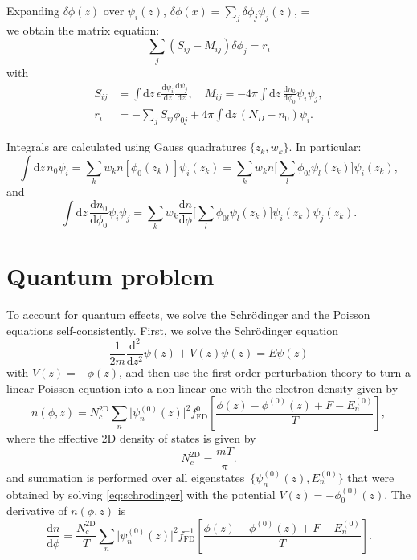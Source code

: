 \documentclass[10pt]{article}
\newcommand{\dd}{\mathrm{d}}
\newcommand{\fFD}{f_{\mathrm{FD}}}
\begin{document}
Expanding $\delta\phi(z)$ over $\psi_i(z)$, $\delta\phi(x) = \sum_j \delta\phi_j \psi_j(z)$, = \\
we obtain the matrix equation:
\begin{equation}
	\sum_j \left( S_{ij} - M_{ij} \right) \delta\phi_j = r_i
\end{equation}
with
\begin{equation}
\begin{split}
	S_{ij} &= \int \dd z \, \epsilon \frac{\dd \psi_i}{\dd z} \frac{\dd \psi_j}{\dd z}, \quad
	M_{ij} = -4\pi \int \dd z \, \frac{\dd n_0}{\dd \phi_0} \psi_i \psi_j, \\
	r_i &= - \sum_j S_{ij} \phi_{0j} + 4\pi \int \dd z \, (N_D - n_0) \psi_i.
\end{split}
\end{equation}

Integrals are calculated using Gauss quadratures $\{z_k, w_k\}$. In particular:
\begin{equation}
	\int \dd z \, n_0 \psi_i = \sum_k w_k n[\phi_0(z_k)] \psi_i(z_k)
	= \sum_k w_k n\Big[ \sum_l \phi_{0l} \psi_l(z_k) \Big] \psi_i(z_k),
\end{equation}
and
\begin{equation}
	\int \dd z \, \frac{\dd n_0}{\dd \phi_0} \psi_i \psi_j
	= \sum_k w_k \frac{\dd n}{\dd \phi}
		\Big[ \sum_l \phi_{0l} \psi_l(z_k) \Big] \psi_i(z_k) \psi_j(z_k).
\end{equation}

\section{Quantum problem}

To account for quantum effects, we solve the Schr\"odinger and the Poisson
equations self-consistently. First, we solve the Schr\"odinger equation
\begin{equation}
	\label{eq:schrodinger}
	\frac{1}{2m} \frac{\dd^2}{\dd z^2} \psi(z) + V(z) \psi(z) = E \psi(z)
\end{equation}
with $V(z) = -\phi(z)$, and then use the first-order perturbation theory to turn a
linear Poisson equation into a non-linear one with the electron density given by
\begin{equation}
	n(\phi, z) = N_c^\mathrm{2D} \sum_n \lvert\psi_n^{(0)}(z)\rvert^2 \fFD^0
				 \left[ \frac{\phi(z) - \phi^{(0)}(z) + F - E_n^{(0)}}{T} \right],
\end{equation}
where the effective 2D density of states is given by
\begin{equation}
	N_c^\mathrm{2D} = \frac{m T}{\pi}.
\end{equation}
and summation is performed over all eigenstates~$\{ \psi_n^{(0)}(z), E_n^{(0)} \}$
that were obtained by solving \eqref{eq:schrodinger} with the potential
$V(z) = -\phi_0^{(0)}(z)$. The derivative of $n(\phi, z)$ is
\begin{equation}
	\frac{\dd n}{\dd \phi} =
		\frac{N_c^\mathrm{2D}}{T} \sum_n \lvert\psi_n^{(0)}(z)\rvert^2 \fFD^{-1}
		\left[ \frac{\phi(z) - \phi^{(0)}(z) + F - E_n^{(0)}}{T} \right].
\end{equation}
\end{document}

